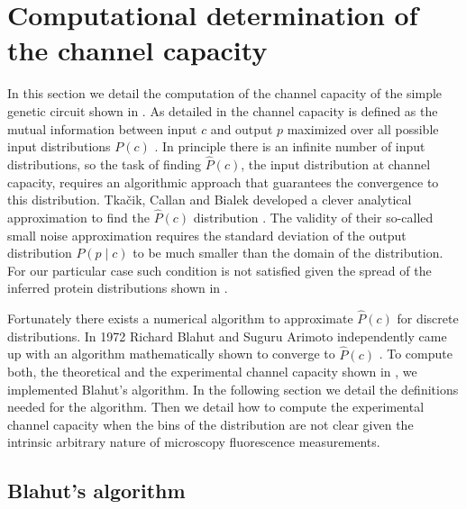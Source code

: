 \section{Computational determination of the channel capacity}
\label{supp_channcap}

In this section we detail the computation of the channel capacity of the simple
genetic circuit shown in . As detailed in
 the channel capacity is defined as the mutual information
between input $c$ and output $p$ maximized over all possible input distributions
$P(c)$ \cite{Shannon1948}. In principle there is an infinite number of input
distributions, so the task of finding $\hat{P}(c)$, the input distribution at
channel capacity, requires an algorithmic approach that guarantees the
convergence to this distribution. Tkačik, Callan and Bialek developed a clever
analytical approximation to find the $\hat{P}(c)$ distribution
\cite{Tkacik2008a}. The validity of their so-called small noise approximation
requires the standard deviation of the output distribution $P(p \mid c)$ to be
much smaller than the domain of the distribution. For our particular case such
condition is not satisfied given the spread of the inferred protein
distributions shown in .

Fortunately there exists a numerical algorithm to approximate $\hat{P}(c)$ for
discrete distributions. In 1972 Richard Blahut and Suguru Arimoto independently
came up with an algorithm mathematically shown to converge to $\hat{P}(c)$
\cite{Blahut1972}. To compute both, the theoretical and the experimental channel
capacity shown in , we implemented Blahut's algorithm. In
the following section we detail the definitions needed for the algorithm. Then
we detail how to compute the experimental channel capacity when the bins of the
distribution are not clear given the intrinsic arbitrary nature of microscopy
fluorescence measurements.

\subsection{Blahut's algorithm}


